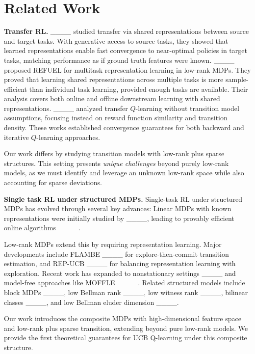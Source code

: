 \section{Related Work}
\noindent
\textbf{Transfer RL.}
____ studied transfer via shared representations between source and target tasks. With generative access to source tasks, they showed that learned representations enable fast convergence to near-optimal policies in target tasks, matching performance as if ground truth features were known. ____ proposed REFUEL for multitask representation learning in low-rank MDPs. They proved that learning shared representations across multiple tasks is more sample-efficient than individual task learning, provided enough tasks are available. Their analysis covers both online and offline downstream learning with shared representations.
____ analyzed transfer $Q$-learning without transition model assumptions, focusing instead on reward function similarity and transition density. These works established convergence guarantees for both backward and iterative $Q$-learning approaches.

Our work differs by studying transition models with low-rank plus sparse structures. This setting presents {\em unique challenges} beyond purely low-rank models, as we must identify and leverage an unknown low-rank space while also accounting for sparse deviations.


\smallskip
\noindent
\textbf{Single task RL under structured MDPs.}
Single-task RL under structured MDPs has evolved through several key advances:
Linear MDPs with known representations were initially studied by ____, leading to provably efficient online algorithms ____.

Low-rank MDPs extend this by requiring representation learning. Major developments include FLAMBE ____ for explore-then-commit transition estimation, and REP-UCB ____ for balancing representation learning with exploration. Recent work has expanded to nonstationary settings ____ and model-free approaches like MOFFLE ____.
Related structured models include block MDPs ____, low Bellman rank ____, low witness rank ____, bilinear classes ____, and low Bellman eluder dimension ____.

Our work introduces the composite MDPs with high-dimensional feature space and low-rank plus sparse transition, extending beyond pure low-rank models. We provide the first theoretical guarantees for UCB Q-learning under this composite structure.

